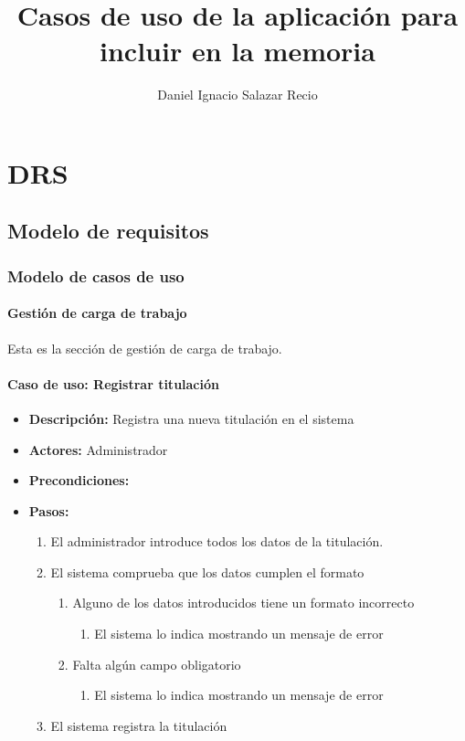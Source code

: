 \documentclass{book}
\title{Casos de uso de la aplicación para incluir en la memoria
}
\author{Daniel Ignacio Salazar Recio}
\begin{document}
\maketitle
\chapter{DRS}
\section{Modelo de requisitos}
\subsection{Modelo de casos de uso}
\subsubsection*{Gestión de carga de trabajo}
Esta es la sección de gestión de carga de trabajo.

\subsubsection*{Caso de uso: Registrar titulación}
\begin{itemize}
\item{\bf Descripción:} Registra una nueva titulación en el sistema
\item{\bf Actores:} Administrador
\item{\bf Precondiciones:}
\item{\bf Pasos:}
\begin{enumerate}
\item El administrador introduce todos los datos de la titulación.
\item El sistema comprueba que los datos cumplen el formato
	\begin{enumerate}
	\item Alguno de los datos introducidos tiene un formato incorrecto
		\begin{enumerate}
		\item El sistema lo indica mostrando un mensaje de error
		\end{enumerate}
	\item Falta algún campo obligatorio
		\begin{enumerate}
		\item El sistema lo indica mostrando un mensaje de error
		\end{enumerate}
	\end{enumerate}
\item El sistema registra la titulación
\end{enumerate}
\end{itemize}
\end{document}
